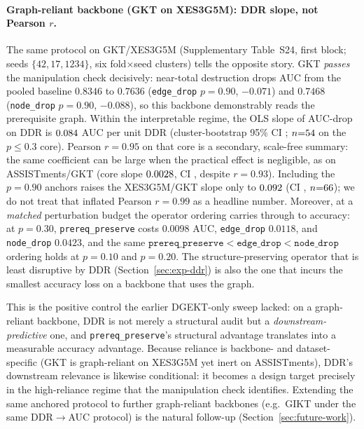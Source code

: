 \documentclass[preprint,10pt,doubleblind]{elsarticle}
\newcommand{\DDR}{\textsc{DDR}}
\begin{document}
\paragraph{Graph-reliant backbone (GKT on XES3G5M): \DDR{} slope, not Pearson $r$.}
The same protocol on GKT/XES3G5M (Supplementary Table~S24, first
block; seeds $\{42,17,1234\}$, six fold$\times$seed clusters) tells the opposite story. GKT \emph{passes} the
manipulation check decisively: near-total destruction drops AUC from the
pooled baseline $0.8346$ to $0.7636$ (\texttt{edge\_drop} $p{=}0.90$, ${-}0.071$) and
$0.7468$ (\texttt{node\_drop} $p{=}0.90$, ${-}0.088$), so this backbone
demonstrably reads the prerequisite graph. Within the interpretable regime,
the OLS slope of AUC-drop on \DDR{} is $0.084$ AUC per unit \DDR{}
(cluster-bootstrap 95\% CI \DDRslopeXEScoreci; $n{=}54$ on the
$p{\le}0.3$ core). Pearson $r{=}0.95$ on that core is a secondary, scale-free
summary: the same coefficient can be large when the practical effect is
negligible, as on ASSISTments/GKT (core slope $0.0028$, CI
\DDRslopeASSISTcoreci, despite $r{=}0.93$). Including the $p{=}0.90$ anchors
raises the XES3G5M/GKT slope only to $0.092$ (CI \DDRslopeXESfullci,
$n{=}66$); we do not treat that inflated Pearson $r{=}0.99$ as a
headline number. Moreover, at a \emph{matched} perturbation budget the
operator ordering carries through to accuracy: at $p{=}0.30$,
\texttt{prereq\_preserve} costs $0.0098$ AUC, \texttt{edge\_drop} $0.0118$, and
\texttt{node\_drop} $0.0423$, and the same
$\texttt{prereq\_preserve}<\texttt{edge\_drop}<\texttt{node\_drop}$ ordering
holds at $p{=}0.10$ and $p{=}0.20$. The structure-preserving operator that is
least disruptive by \DDR{} (Section~\ref{sec:exp-ddr}) is also the one that
incurs the smallest accuracy loss on a backbone that uses the graph.

This is the positive control the earlier DGEKT-only sweep lacked: on a
graph-reliant backbone, \DDR{} is not merely a structural audit but a
\emph{downstream-predictive} one, and \texttt{prereq\_preserve}'s structural
advantage translates into a measurable accuracy advantage. Because reliance is
backbone- and dataset-specific (GKT is graph-reliant on XES3G5M yet inert on
ASSISTments), \DDR{}'s downstream relevance is likewise conditional: it becomes
a design target precisely in the high-reliance regime that the manipulation
check identifies. Extending the same anchored protocol to further graph-reliant
backbones (e.g.\ GIKT under the same \DDR{}$\to$AUC protocol) is the natural
follow-up (Section~\ref{sec:future-work}).
\end{document}
